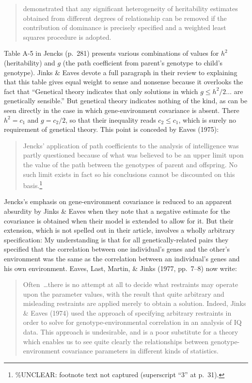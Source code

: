 ﻿\documentclass[12pt]{article}
\begin{document}
\begin{quote}
demonstrated that any significant heterogeneity of heritability estimates obtained from different degrees of relationship can be removed if the contribution of dominance is precisely specified and a weighted least squares procedure is adopted.
\end{quote}

Table A-5 in Jencks (p.\ 281) presents various combinations of values for $h^2$ (heritability) and $g$ (the path coefficient from parent's genotype to child's genotype). Jinks \& Eaves devote a full paragraph in their review to explaining that this table gives equal weight to sense and nonsense because it overlooks the fact that ``Genetical theory indicates that only solutions in which $g \le h^2/2 \ldots$ are genetically sensible.'' But genetical theory indicates nothing of the kind, as can be seen directly in the case in which gene-environment covariance is absent. There $h^2 = c_1$ and $g = c_2/2$, so that their inequality reads $c_2 \le c_1$, which is surely no requirement of genetical theory. This point is conceded by Eaves (1975):

\begin{quote}
Jencks' application of path coefficients to the analysis of intelligence was partly questioned because of what was believed to be an upper limit upon the value of the path between the genotypes of parent and offspring. No such limit exists in fact so his conclusions cannot be discounted on this basis.\footnote{\%UNCLEAR: footnote text not captured (superscript ``3'' at p.\ 31).}
\end{quote}

Jencks's emphasis on gene-environment covariance is reduced to an apparent absurdity by Jinks \& Eaves when they note that a negative estimate for the covariance is obtained when their model is extended to allow for it. But their extension, which is not spelled out in their article, involves a wholly arbitrary specification: My understanding is that for all genetically-related pairs they specified that the correlation between one individual's genes and the other's environment was the same as the correlation between an individual's genes and his own environment. Eaves, Last, Martin, \& Jinks (1977, pp.\ 7--8) now write:

\begin{quote}
Often~\ldots there is no attempt at all to decide what restraints may operate upon the parameter values, with the result that quite arbitrary and misleading restraints are applied merely to obtain a solution. Indeed, Jinks \& Eaves (1974) used the approach of specifying arbitrary restraints in order to solve for genotype-environmental correlation in an analysis of IQ data. This approach is undesirable, and is a poor substitute for a theory which enables us to see quite clearly the relationships between genotype-environment covariance parameters in different kinds of statistics.
\end{quote}
\end{document}
